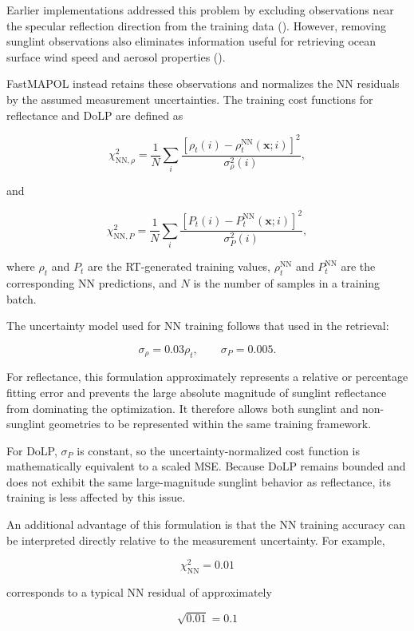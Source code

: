 \documentclass[
  11pt,
  letterpaper,
]{scrreprt}
\begin{document}
Earlier implementations addressed this problem by excluding observations
near the specular reflection direction from the training data
(). However, removing sunglint
observations also eliminates information useful for retrieving ocean
surface wind speed and aerosol properties ().

FastMAPOL instead retains these observations and normalizes the NN
residuals by the assumed measurement uncertainties. The training cost
functions for reflectance and DoLP are defined as

\[
\chi^2_{\mathrm{NN},\rho}
=
\frac{1}{N}
\sum_i
\frac{
\left[
\rho_t(i)-\rho_t^{\mathrm{NN}}(\mathbf{x};i)
\right]^2
}{
\sigma_\rho^2(i)
},
\]

and

\[
\chi^2_{\mathrm{NN},P}
=
\frac{1}{N}
\sum_i
\frac{
\left[
P_t(i)-P_t^{\mathrm{NN}}(\mathbf{x};i)
\right]^2
}{
\sigma_P^2(i)
},
\]

where \(\rho_t\) and \(P_t\) are the RT-generated training values,
\(\rho_t^{\mathrm{NN}}\) and \(P_t^{\mathrm{NN}}\) are the corresponding
NN predictions, and \(N\) is the number of samples in a training batch.

The uncertainty model used for NN training follows that used in the
retrieval:

\[
\sigma_\rho = 0.03\rho_t,
\qquad
\sigma_P = 0.005.
\]

For reflectance, this formulation approximately represents a relative or
percentage fitting error and prevents the large absolute magnitude of
sunglint reflectance from dominating the optimization. It therefore
allows both sunglint and non-sunglint geometries to be represented
within the same training framework.

For DoLP, \(\sigma_P\) is constant, so the uncertainty-normalized cost
function is mathematically equivalent to a scaled MSE. Because DoLP
remains bounded and does not exhibit the same large-magnitude sunglint
behavior as reflectance, its training is less affected by this issue.

An additional advantage of this formulation is that the NN training
accuracy can be interpreted directly relative to the measurement
uncertainty. For example,

\[
\chi^2_{\mathrm{NN}}=0.01
\]

corresponds to a typical NN residual of approximately

\[
\sqrt{0.01}=0.1
\]
\end{document}
